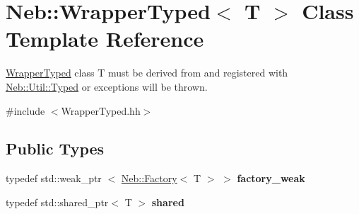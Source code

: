 \hypertarget{classNeb_1_1WrapperTyped}{\section{\-Neb\-:\-:\-Wrapper\-Typed$<$ \-T $>$ \-Class \-Template \-Reference}
\label{classNeb_1_1WrapperTyped}
}


\hyperlink{classNeb_1_1WrapperTyped}{\-Wrapper\-Typed} class \-T must be derived from and registered with \hyperlink{classNeb_1_1Util_1_1Typed}{\-Neb\-::\-Util\-::\-Typed} or exceptions will be thrown.  




{\ttfamily \#include $<$\-Wrapper\-Typed.\-hh$>$}

\subsection*{\-Public \-Types}
\begin{DoxyCompactItemize}
\item 
\hypertarget{classNeb_1_1WrapperTyped_a5aa27220e225486790dc20ba7ec748fb}{typedef std\-::weak\-\_\-ptr\*
$<$ \hyperlink{classNeb_1_1Factory}{\-Neb\-::\-Factory}$<$ \-T $>$ $>$ {\bfseries factory\-\_\-weak}}\label{classNeb_1_1WrapperTyped_a5aa27220e225486790dc20ba7ec748fb}

\item 
\hypertarget{classNeb_1_1WrapperTyped_a3467a3d9954e2176508f0913fb28bc43}{typedef std\-::shared\-\_\-ptr$<$ \-T $>$ {\bfseries shared}}\label{classNeb_1_1WrapperTyped_a3467a3d9954e2176508f0913fb28bc43}

\end{DoxyCompactItemize}
